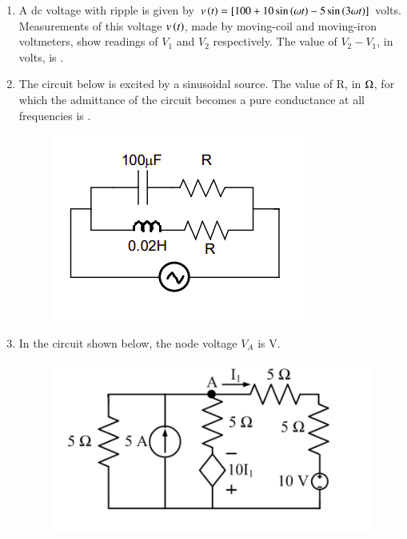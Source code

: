 \documentclass[journal,12pt,onecolumn]{IEEEtran}
\theoremstyle{remark}
\begin{document}
\begin{enumerate}[start=1, label=Q.\arabic*]
    \hfill{}

    \item A dc voltage with ripple is given by $v\left(t\right) = [100 + 10 \sin\left(\omega t\right) - 5 \sin\left(3\omega t\right)]$ volts. Measurements of this voltage $v\left(t\right)$, made by moving-coil and moving-iron voltmeters, show readings of $V_1$ and $V_2$ respectively. The value of $V_2 - V_1$, in volts, is \underline{\hspace{2cm}}.

    \hfill{}

    \item The circuit below is excited by a sinusoidal source. The value of R, in $\ohm$, for which the admittance of the circuit becomes a pure conductance at all frequencies is \underline{\hspace{2cm}}.
    \begin{figure}[H]
        \includegraphics[width=0.5\columnwidth]{Figures/q54.png}
        \centering
        \caption{}
    \end{figure}

    \hfill{}

    \item In the circuit shown below, the node voltage $V_A$ is \underline{\hspace{2cm}} V.
    \begin{figure}[H]
        \includegraphics[width=0.6\columnwidth]{Figures/q55.png}
                \centering
        \caption{}
    \end{figure}


\end{enumerate}
\end{document}
